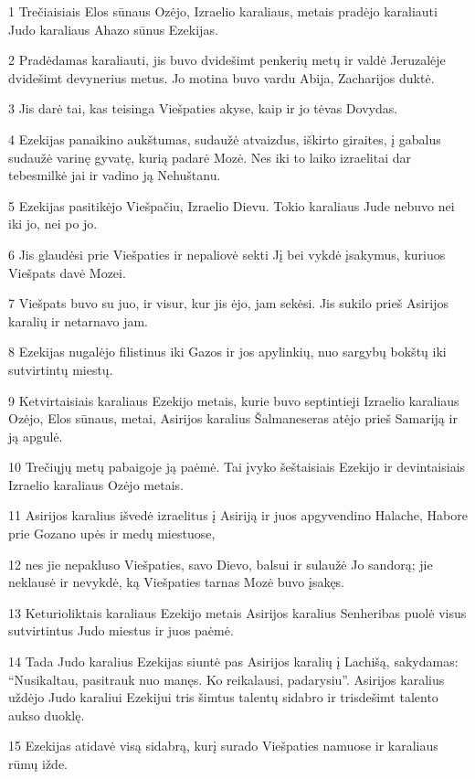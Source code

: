 \par 1 Trečiaisiais Elos sūnaus Ozėjo, Izraelio karaliaus, metais pradėjo karaliauti Judo karaliaus Ahazo sūnus Ezekijas. 
\par 2 Pradėdamas karaliauti, jis buvo dvidešimt penkerių metų ir valdė Jeruzalėje dvidešimt devynerius metus. Jo motina buvo vardu Abija, Zacharijos duktė. 
\par 3 Jis darė tai, kas teisinga Viešpaties akyse, kaip ir jo tėvas Dovydas. 
\par 4 Ezekijas panaikino aukštumas, sudaužė atvaizdus, iškirto giraites, į gabalus sudaužė varinę gyvatę, kurią padarė Mozė. Nes iki to laiko izraelitai dar tebesmilkė jai ir vadino ją Nehuštanu. 
\par 5 Ezekijas pasitikėjo Viešpačiu, Izraelio Dievu. Tokio karaliaus Jude nebuvo nei iki jo, nei po jo. 
\par 6 Jis glaudėsi prie Viešpaties ir nepaliovė sekti Jį bei vykdė įsakymus, kuriuos Viešpats davė Mozei. 
\par 7 Viešpats buvo su juo, ir visur, kur jis ėjo, jam sekėsi. Jis sukilo prieš Asirijos karalių ir netarnavo jam. 
\par 8 Ezekijas nugalėjo filistinus iki Gazos ir jos apylinkių, nuo sargybų bokštų iki sutvirtintų miestų. 
\par 9 Ketvirtaisiais karaliaus Ezekijo metais, kurie buvo septintieji Izraelio karaliaus Ozėjo, Elos sūnaus, metai, Asirijos karalius Šalmaneseras atėjo prieš Samariją ir ją apgulė. 
\par 10 Trečiųjų metų pabaigoje ją paėmė. Tai įvyko šeštaisiais Ezekijo ir devintaisiais Izraelio karaliaus Ozėjo metais. 
\par 11 Asirijos karalius išvedė izraelitus į Asiriją ir juos apgyvendino Halache, Habore prie Gozano upės ir medų miestuose, 
\par 12 nes jie nepakluso Viešpaties, savo Dievo, balsui ir sulaužė Jo sandorą; jie neklausė ir nevykdė, ką Viešpaties tarnas Mozė buvo įsakęs. 
\par 13 Keturioliktais karaliaus Ezekijo metais Asirijos karalius Senheribas puolė visus sutvirtintus Judo miestus ir juos paėmė. 
\par 14 Tada Judo karalius Ezekijas siuntė pas Asirijos karalių į Lachišą, sakydamas: “Nusikaltau, pasitrauk nuo manęs. Ko reikalausi, padarysiu”. Asirijos karalius uždėjo Judo karaliui Ezekijui tris šimtus talentų sidabro ir trisdešimt talento aukso duoklę. 
\par 15 Ezekijas atidavė visą sidabrą, kurį surado Viešpaties namuose ir karaliaus rūmų ižde. 
